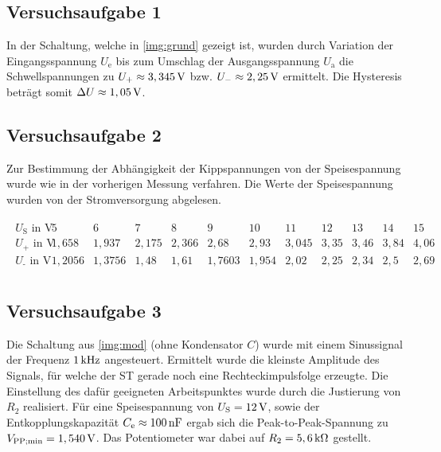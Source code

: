 \documentclass[numbers=noenddot,12pt,a4paper]{scrartcl}
\newcommand{\ix}[1]{_\text{#1}}
\begin{document}
\subsection{Versuchsaufgabe 1}
In der Schaltung, welche in \ref{img:grund} gezeigt ist, wurden durch Variation der Eingangsspannung $U\ix{e}$ bis zum Umschlag der Ausgangsspannung $U\ix{a}$ die Schwellspannungen zu $U_+\approx\unit[3,345]{V}$ bzw. $U_-\approx\unit[2,25]{V}$ ermittelt. Die Hysteresis beträgt somit $\Delta U\approx\unit[1,05]{V}$.
\subsection{Versuchsaufgabe 2}
Zur Bestimmung der Abhängigkeit der Kippspannungen von der Speisespannung wurde wie in der vorherigen Messung verfahren. Die Werte der Speisespannung wurden von der Stromversorgung abgelesen. 
\begin{table}[H]
\begin{align*}
\begin{array}{c||c|c|c|c|c|c|c|c|c|c|c}
U\ix{S}\text{ in V} & 5 & 6 & 7 & 8 & 9 & 10 & 11 & 12 & 13 & 14 & 15 \\ \hline
U\ix{+}\text{ in V} & 1,658 & 1,937 & 2,175 & 2,366 & 2,68 & 2,93 & 3,045 & 3,35 & 3,46 & 3,84 & 4,06 \\ \hline
U\ix{-}\text{ in V} & 1,2056 & 1,3756 & 1,48 & 1,61 & 1,7603 & 1,954 & 2,02 & 2,25 & 2,34 & 2,5 & 2,69 \\ 
\end{array}
\end{align*}
\end{table}
\subsection{Versuchsaufgabe 3}
Die Schaltung aus \ref{img:mod} (ohne Kondensator $C$) wurde mit einem Sinussignal der Frequenz $\unit[1]{kHz}$ angesteuert. Ermittelt wurde die kleinste Amplitude des Signals, für welche der ST gerade noch eine Rechteckimpulsfolge erzeugte. Die Einstellung des dafür geeigneten Arbeitspunktes wurde durch die Justierung von $R_2$ realisiert. Für eine Speisespannung von $U\ix{S}=\unit[12]{V}$, sowie der Entkopplungskapazität $C\ix{e}\approx\unit[100]{nF}$ ergab sich die Peak-to-Peak-Spannung zu $V\ix{PP;min}=\unit[1,540]{V}$. Das Potentiometer war dabei auf $R_2=\unit[5,6]{k\Omega}$ gestellt.  
\end{document}
